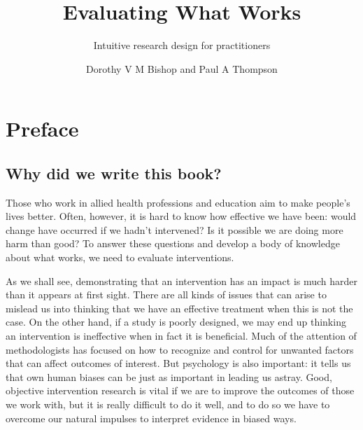 \documentclass{krantz}
\title{Evaluating What Works}
\subtitle{Intuitive research design for practitioners}
\author{Dorothy V M Bishop and Paul A Thompson}
\begin{document}
\setcounter{page}{1}
\frontmatter
\maketitle
\setcounter{page}{1} %

\tableofcontents





%
%




\chapter*{Preface}\label{preface}


\hypertarget{why-did-we-write-this-book}{%
\section*{Why did we write this book?}\label{why-did-we-write-this-book}}

Those who work in allied health professions and education aim to make people's lives better. Often, however, it is hard to know how effective we have been: would change have occurred if we hadn't intervened? Is it possible we are doing more harm than good? To answer these questions and develop a body of knowledge about what works, we need to evaluate interventions.

As we shall see, demonstrating that an intervention has an impact is much harder than it appears at first sight. There are all kinds of issues that can arise to mislead us into thinking that we have an effective treatment when this is not the case. On the other hand, if a study is poorly designed, we may end up thinking an intervention is ineffective when in fact it is beneficial. Much of the attention of methodologists has focused on how to recognize and control for unwanted factors that can affect outcomes of interest. But psychology is also important: it tells us that own human biases can be just as important in leading us astray. Good, objective intervention research is vital if we are to improve the outcomes of those we work with, but it is really difficult to do it well, and to do so we have to overcome our natural impulses to interpret evidence in biased ways.
\end{document}
